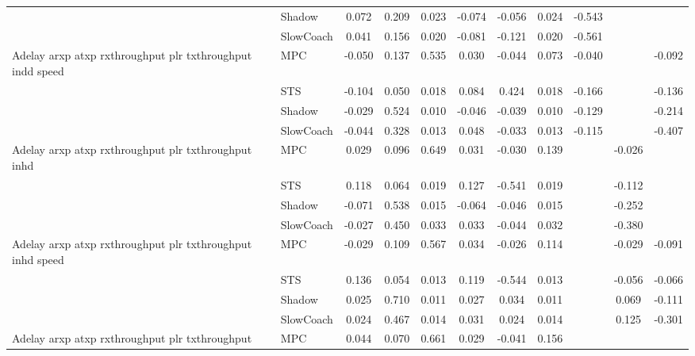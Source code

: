 \begin{tabular}{|l|l|*{9}{c|}}
                              & Shadow &    0.072 &     0.209 &     0.023 & -0.074 & -0.056 &  0.024 &  -0.543 &      &       \\
                              & SlowCoach &    0.041 &     0.156 &     0.020 & -0.081 & -0.121 &  0.020 &  -0.561 &      &       \\
\midrule
Adelay arxp atxp rxthroughput plr txthroughput indd speed    & MPC &   -0.050 &     0.137 &     0.535 &  0.030 & -0.044 &  0.073 &  -0.040 &      &   -0.092 \\
                              & STS &   -0.104 &     0.050 &     0.018 &  0.084 &  0.424 &  0.018 &  -0.166 &      &   -0.136 \\
                              & Shadow &   -0.029 &     0.524 &     0.010 & -0.046 & -0.039 &  0.010 &  -0.129 &      &   -0.214 \\
                              & SlowCoach &   -0.044 &     0.328 &     0.013 &  0.048 & -0.033 &  0.013 &  -0.115 &      &   -0.407 \\
\midrule
Adelay arxp atxp rxthroughput plr txthroughput inhd    & MPC &    0.029 &     0.096 &     0.649 &  0.031 & -0.030 &  0.139 &      &  -0.026 &       \\
                              & STS &    0.118 &     0.064 &     0.019 &  0.127 & -0.541 &  0.019 &      &  -0.112 &       \\
                              & Shadow &   -0.071 &     0.538 &     0.015 & -0.064 & -0.046 &  0.015 &      &  -0.252 &       \\
                              & SlowCoach &   -0.027 &     0.450 &     0.033 &  0.033 & -0.044 &  0.032 &      &  -0.380 &       \\
\midrule
Adelay arxp atxp rxthroughput plr txthroughput inhd speed    & MPC &   -0.029 &     0.109 &     0.567 &  0.034 & -0.026 &  0.114 &      &  -0.029 &   -0.091 \\
                              & STS &    0.136 &     0.054 &     0.013 &  0.119 & -0.544 &  0.013 &      &  -0.056 &   -0.066 \\
                              & Shadow &    0.025 &     0.710 &     0.011 &  0.027 &  0.034 &  0.011 &      &   0.069 &   -0.111 \\
                              & SlowCoach &    0.024 &     0.467 &     0.014 &  0.031 &  0.024 &  0.014 &      &   0.125 &   -0.301 \\
\midrule
Adelay arxp atxp rxthroughput plr txthroughput    & MPC &    0.044 &     0.070 &     0.661 &  0.029 & -0.041 &  0.156 &      &      &       \\

\end{tabular}
